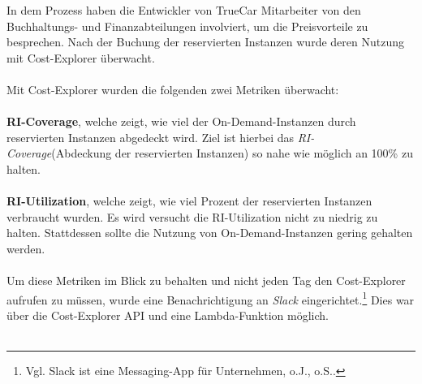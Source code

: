 In dem Prozess haben die Entwickler von TrueCar Mitarbeiter von den Buchhaltungs- und Finanzabteilungen involviert, um die Preisvorteile zu besprechen. Nach der Buchung der reservierten Instanzen wurde deren Nutzung mit Cost-Explorer überwacht. 
\\\\
Mit Cost-Explorer wurden die folgenden zwei Metriken überwacht: 
\\\\
\textbf{RI-Coverage}, welche zeigt, wie viel der On-Demand-Instanzen durch reservierten Instanzen abgedeckt wird. Ziel ist hierbei das \textit{RI-Coverage}(Abdeckung der reservierten Instanzen) so nahe wie möglich an 100\% zu halten.
\\\\
\textbf{RI-Utilization}, welche zeigt, wie viel Prozent der reservierten Instanzen verbraucht wurden. Es wird versucht die RI-Utilization nicht zu niedrig zu halten. Stattdessen sollte die Nutzung von On-Demand-Instanzen gering gehalten werden. 
\\\\
Um diese Metriken im Blick zu behalten und nicht jeden Tag den Cost-Explorer aufrufen zu müssen, wurde eine Benachrichtigung an \textit{Slack} eingerichtet.\footnote{Vgl. Slack ist eine Messaging-App für Unternehmen, o.J., o.S.\cite{SLACK}.} Dies war über die Cost-Explorer API und eine Lambda-Funktion möglich.
\\\\


